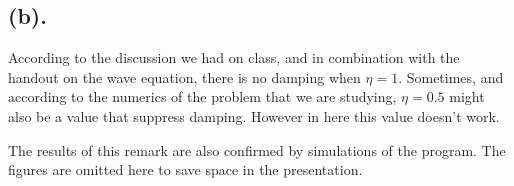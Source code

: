 
\subsection{(b).}
\label{subsec: damping}
According to the discussion we had on class, and in combination with the handout on the wave equation, there is no damping when \( \eta = 1 \). Sometimes, and according to the numerics of the problem that we are studying, \( \eta = 0.5 \) might also be a value that suppress damping. However in here this value doesn't work.

The results of this remark are also confirmed by simulations of the program. The figures are omitted here to save space in the presentation.

